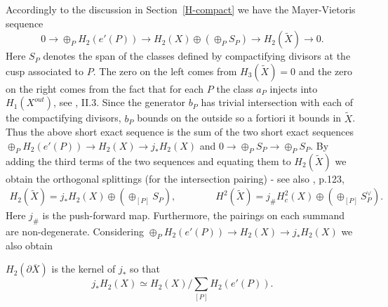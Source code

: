 Accordingly to the discussion in Section~\ref{H-compact} we have the Mayer-Vietoris sequence
\[
0 \to \oplus_P H_2(e'(P)) \to H_2(X) \oplus (\oplus_P S_P)  \to H_2(\tilde{X}) \to 0.
\]
Here $S_{P}$ denotes the span of the classes defined by compactifying divisors at the cusp associated to $P$. The zero on the left comes from $H_3(\tilde{X}) =0$ and the zero on the right comes from the fact that for each $P$ the class $a_P$ injects into $H_1(X^{out})$, see \cite{vGeer}, II.3. Since the generator $b_P$ has trivial intersection with each of the compactifying divisors, $b_P$ bounds on the outside so a fortiori it bounds in $\tilde{X}$. Thus the above short exact sequence is the sum
of the two short exact sequences $\oplus_P H_2(e'(P)) \to H_2(X) \to j_{\ast} H_2(X)$ and
$ 0 \to \oplus_P S_P \to \oplus_P S_P $.  By adding the third terms of the two sequences and equating them to $H_2(\tilde{X})$  we obtain the orthogonal splittings (for the intersection pairing) - see also \cite{vGeer}, p.123,
\begin{align*}\label{vdG2}
H_2(\tilde{X}) = j_{\ast} H_2(X) \oplus \left( \oplus_{[P]} S_{P} \right), \qquad \qquad 
H^2(\tilde{X})  = j_{\#} H_c^2(X) \oplus \left(\oplus_{[P]} S^{\vee}_{P}\right).
\end{align*}
Here $j_{\#}$ is the push-forward map. Furthermore, the pairings on each summand are non-degenerate. Considering $\oplus_P H_2(e'(P)) \to H_2(X) \to j_{\ast} H_2(X)$ we also obtain
\begin{proposition}\label{intersectionhom}
$H_2(\partial \overline{X})$ is the kernel of $j_{\ast}$ so that
\[
j_{\ast} H_2(X) \simeq H_2(X)/ \sum_{[P]} H_2(e'(P)).
\]
\end{proposition}



